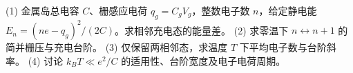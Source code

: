 (1) 金属岛总电容 \(C\)、栅感应电荷 \(q_g=C_gV_g\)，整数电子数 \(n\)，给定静电能 \(E_n=(ne-q_g)^2/(2C)\)。求相邻充电态的能量差。
(2) 求零温下 \(n\leftrightarrow n+1\) 的简并栅压与充电台阶。
(3) 仅保留两相邻态，求温度 \(T\) 下平均电子数与台阶斜率。
(4) 讨论 \(k_BT\ll e^2/C\) 的适用性、台阶宽度及电子电荷周期。
